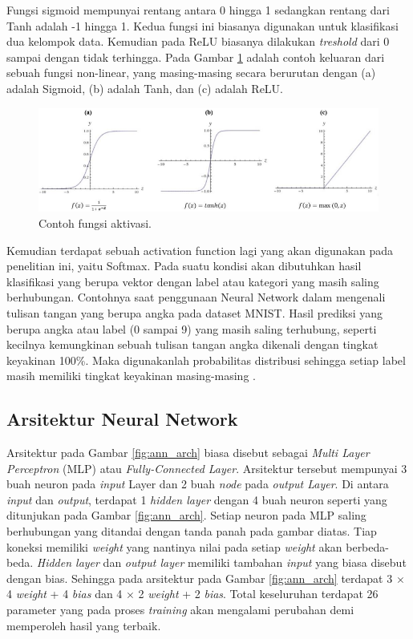 Fungsi sigmoid mempunyai rentang antara 0 hingga 1 sedangkan rentang dari Tanh adalah -1 hingga 1. Kedua fungsi ini biasanya digunakan untuk klasifikasi dua kelompok data. Kemudian pada ReLU biasanya dilakukan \textit{treshold} dari 0 sampai dengan tidak terhingga. Pada Gambar \ref{fig:ann_non_linear} \citep{buduma2017} adalah contoh keluaran dari sebuah fungsi non-linear, yang masing-masing secara berurutan dengan (a) adalah Sigmoid, (b) adalah Tanh, dan (c) adalah ReLU.
\vspace{1ex}

\begin{figure} [!h] \centering
	\includegraphics[scale=0.68]{img/ann_non_linear.png}
	\caption{Contoh fungsi aktivasi.}
	\label{fig:ann_non_linear}
\end{figure}

Kemudian terdapat sebuah activation function lagi yang akan digunakan pada penelitian ini, yaitu Softmax. Pada suatu kondisi akan dibutuhkan hasil klasifikasi yang berupa vektor dengan label atau kategori yang masih saling berhubungan. Contohnya saat penggunaan Neural Network dalam mengenali tulisan tangan yang berupa angka pada dataset MNIST. Hasil prediksi yang berupa angka atau label (0 sampai 9) yang masih saling terhubung, seperti kecilnya kemungkinan sebuah tulisan tangan angka dikenali dengan tingkat keyakinan 100\%. Maka digunakanlah probabilitas distribusi sehingga setiap label masih memiliki tingkat keyakinan masing-masing \citep{buduma2017}.
\vspace{1ex}

\subsection{Arsitektur Neural Network}
\label{sec:sub_sec2_nn_arch}

Arsitektur pada Gambar \ref{fig:ann_arch} biasa disebut sebagai \textit{Multi Layer Perceptron} (MLP) atau \textit{Fully-Connected Layer}. Arsitektur tersebut mempunyai 3 buah neuron pada \textit{input} Layer dan 2 buah \textit{node} pada \textit{output Layer}. Di antara \textit{input} dan \textit{output}, terdapat 1 \textit{hidden layer} dengan 4 buah neuron seperti yang ditunjukan pada Gambar \ref{fig:ann_arch}. Setiap neuron pada MLP saling berhubungan yang ditandai dengan tanda panah pada gambar diatas. Tiap koneksi memiliki \textit{weight} yang nantinya nilai pada setiap \textit{weight} akan berbeda-beda. \textit{Hidden layer} dan \textit{output layer} memiliki tambahan \textit{input} yang biasa disebut dengan bias. Sehingga pada arsitektur pada Gambar \ref{fig:ann_arch} terdapat 3 $\times$ 4 \textit{weight} + 4 \textit{bias} dan 4 $\times$ 2 \textit{weight} + 2 \textit{bias}. Total keseluruhan terdapat 26 parameter yang pada proses \textit{training} akan mengalami perubahan demi memperoleh hasil yang terbaik.

